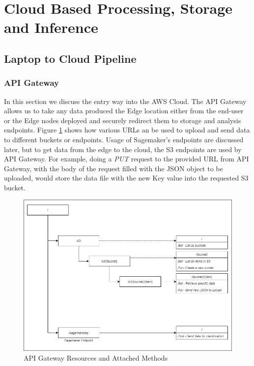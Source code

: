 \section{Cloud Based Processing, Storage and Inference}
\label{cloud_services}
\subsection{Laptop to Cloud Pipeline}
\subsubsection{API Gateway}
In this section we discuss the entry way into the AWS Cloud. The API Gateway allows us to take any data produced the Edge location either from the end-user or the Edge nodes deployed and securely redirect them to storage and analysis endpoints. Figure \ref{fig:api_gateway_methods} shows how various URLs an be used to upload and send data to different buckets or endpoints. Usage of Sagemaker's endpoints are discussed later, but to get data from the edge to the cloud, the S3 endpoints are used by API Gateway. For example, doing a \textit{PUT} request to the provided URL from API Gateway, with the body of the request filled with the JSON object to be uploaded, would store the data file with the new Key value into the requested S3 bucket.

\begin{figure}[ht]
    \centering
    \includegraphics[width=1\linewidth]{pages/Chapter4/Chapter 4 Images/api_gateway_1.png}
    \caption{API Gateway Resources and Attached Methods}
    \label{fig:api_gateway_methods}
\end{figure}


